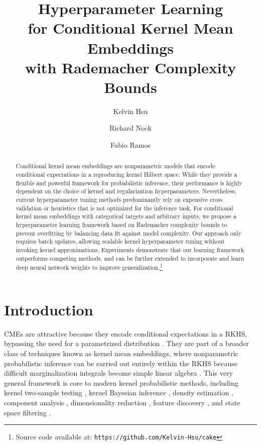 \documentclass[runningheads, envcountsame, a4paper]{llncs}
\title{Hyperparameter Learning \\ for Conditional Kernel Mean Embeddings \\ with Rademacher Complexity Bounds}
\author{Kelvin Hsu \inst{1, 2} \and
		Richard Nock \inst{1, 2, 3} \and
		Fabio Ramos \inst{1, 2}}
\institute{	University of Sydney, Sydney, Australia \\ \and
			Data61, CSIRO, Sydney, Australia \\ \and
			Australian National University, Canberra, Australia}
\begin{document}
	\frontmatter          %
	\maketitle \setcounter{footnote}{0}          %

	\begin{abstract}
		Conditional kernel mean embeddings are nonparametric models that encode conditional expectations in a reproducing kernel Hilbert space. While they provide a flexible and powerful framework for probabilistic inference, their performance is highly dependent on the choice of kernel and regularization hyperparameters. Nevertheless, current hyperparameter tuning methods predominantly rely on expensive cross validation or heuristics that is not optimized for the inference task. For conditional kernel mean embeddings with categorical targets and arbitrary inputs, we propose a hyperparameter learning framework based on Rademacher complexity bounds to prevent overfitting by balancing data fit against model complexity. Our approach only requires batch updates, allowing scalable kernel hyperparameter tuning without invoking kernel approximations. Experiments demonstrate that our learning framework outperforms competing methods, and can be further extended to incorporate and learn deep neural network weights to improve generalization.\footnote{Source code available at: \texttt{https://github.com/Kelvin-Hsu/cake}}
		
	\end{abstract}
	
	\section{Introduction}
	\label{sec:introduction}
	
		\Glspl{CME} are attractive because they encode conditional expectations in a \gls{RKHS}, bypassing the need for a parametrized distribution \citep{song2013kernel}. They are part of a broader class of techniques known as kernel mean embeddings, where nonparametric probabilistic inference can be carried out entirely within the \gls{RKHS} because difficult marginalization integrals become simple linear algebra \citep{muandet2016kernel}. This very general framework is core to modern kernel probabilistic methods, including kernel two-sample testing \citep{gretton2007kernel}, kernel Bayesian inference  \citep{fukumizu2013kernel}, density estimation \citep{song2008tailoring, kanagawa2014recovering}, component analysis \citep{muandet2013domain}, dimensionality reduction \citep{fukumizu2004dimensionality}, feature discovery \citep{jitkrittum2016interpretable}, and state space filtering \citep{kanagawa2016filtering}.
		
\end{document}

